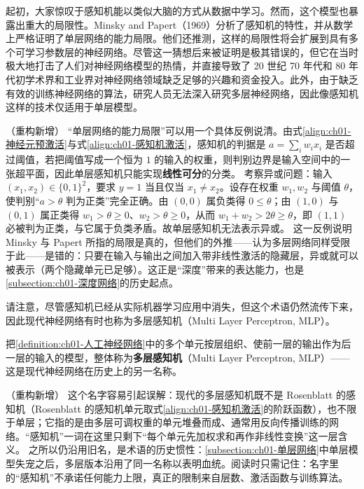 \documentclass[../../main.tex]{subfiles}
\begin{document}
起初，大家惊叹于感知机能以类似大脑的方式从数据中学习。然而，这个模型也暴露出重大的局限性。Minsky and Papert（1969）分析了感知机的特性，并从数学上严格证明了单层网络的能力局限。他们还推测，这样的局限性将会扩展到具有多个可学习参数层的神经网络。尽管这一猜想后来被证明是极其错误的，但它在当时极大地打击了人们对神经网络模型的热情，并直接导致了 20 世纪 70 年代和 80 年代初学术界和工业界对神经网络领域缺乏足够的兴趣和资金投入。此外，由于缺乏有效的训练神经网络的算法，研究人员无法深入研究多层神经网络，因此像感知机这样的技术仅适用于单层模型。

\begin{remark}（重构新增）
“单层网络的能力局限”可以用一个具体反例说清。由式\eqref{align:ch01-神经元预激活}与式\eqref{align:ch01-感知机激活}，感知机的判据是 $a=\sum_i w_i x_i$ 是否超过阈值，若把阈值写成一个恒为 $1$ 的输入的权重，则判别边界是输入空间中的一张超平面，因此单层感知机只能实现\textbf{线性可分}的分类。
考察异或问题：输入 $(x_1,x_2)\in\{0,1\}^{2}$，要求 $y=1$ 当且仅当 $x_1\neq x_2$。设存在权重 $w_1,w_2$ 与阈值 $\theta$，使判别“$a>\theta$ 判为正类”完全正确。由 $(0,0)$ 属负类得 $0\leqslant\theta$；由 $(1,0)$ 与 $(0,1)$ 属正类得 $w_1>\theta\geqslant 0$、$w_2>\theta\geqslant 0$，从而 $w_1+w_2>2\theta\geqslant\theta$，即 $(1,1)$ 必被判为正类，与它属于负类矛盾。故单层感知机无法表示异或。
这一反例说明 Minsky 与 Papert 所指的局限是真的，但他们的外推——认为多层网络同样受限于此——是错的：只要在输入与输出之间加入带非线性激活的隐藏层，异或就可以被表示（两个隐藏单元已足够）。这正是“深度”带来的表达能力，也是\cref{subsection:ch01-深度网络}的历史起点。
\end{remark}

请注意，尽管感知机已经从实际机器学习应用中消失，但这个术语仍然流传下来，因此现代神经网络有时也称为多层感知机（Multi Layer Perceptron, MLP）。

\begin{definition}[多层感知机]\label{definition:ch01-多层感知机}
把\cref{definition:ch01-人工神经网络}中的多个单元按层组织、使前一层的输出作为后一层的输入的模型，整体称为\textbf{多层感知机}（Multi Layer Perceptron, MLP）——这是现代神经网络在历史上的另一名称。
\end{definition}

\begin{remark}（重构新增）
这个名字容易引起误解：现代的多层感知机既不是 Rosenblatt 的感知机（Rosenblatt 的感知机单元取式\eqref{align:ch01-感知机激活}的阶跃函数），也不限于单层；它指的是由多层可调权重的单元堆叠而成、通常用反向传播训练的网络。“感知机”一词在这里只剩下“每个单元先加权求和再作非线性变换”这一层含义。
之所以仍沿用旧名，是术语的历史惯性：\cref{subsection:ch01-单层网络}中单层模型失宠之后，多层版本沿用了同一名称以表明血统。阅读时只需记住：名字里的“感知机”不承诺任何能力上限，真正的限制来自层数、激活函数与训练算法。
\end{remark}
\end{document}
